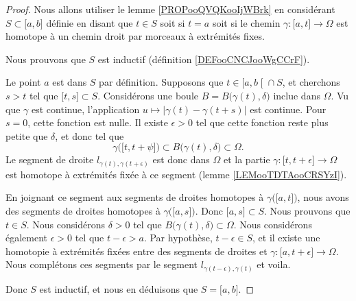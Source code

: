 \begin{proof}
	Nous allons utiliser le lemme \ref{PROPooQVQKooIjWBrk} en considérant \( S\subset \mathopen[ a , b \mathclose]\) définie en disant que \( t\in S\) soit si \( t=a\) soit si le chemin \( \gamma\colon \mathopen[ a , t \mathclose]\to \Omega \) est homotope à un chemin droit par morceaux à extrémités fixes.

	Nous prouvons que \( S\) est inductif (définition \ref{DEFooCNCJooWgCCrF}).
	\begin{subproof}
		\spitem[\( a\in S\)]
		Le point \( a\) est dans \( S\) par définition.
		\spitem[Si \( t\in S\)]
		Supposons que \( t\in \mathopen[ a , b \mathclose[\cap S\), et cherchons \( s>t\) tel que \( \mathopen[ t , s \mathclose]\subset S\). Considérons une boule \( B= B\big( \gamma(t),\delta \big)\) inclue dans \( \Omega\). Vu que \( \gamma\) est continue, l'application \( u\mapsto | \gamma(t)-\gamma(t+s) | \) est continue. Pour \( s=0\), cette fonction est nulle. Il existe \( \epsilon>0\) tel que cette fonction reste plus petite que \( \delta\), et donc tel que
		\begin{equation}
			\gamma\big( \mathopen[ t , t+\psi \mathclose] \big)\subset B\big( \gamma(t),\delta \big)\subset \Omega.
		\end{equation}
		Le segment de droite \( l_{\gamma(t),\gamma(t+\epsilon)} \) est donc dans \( \Omega\) et la partie \( \gamma\colon \mathopen[ t , t+\epsilon \mathclose]\to \Omega\) est homotope à extrémités fixée à ce segment (lemme \ref{LEMooTDTAooCRSYzI}).

		En joignant ce segment aux segments de droites homotopes à \(  \gamma\big( \mathopen[ a , t \mathclose] \big)  \), nous avons des segments de droites homotopes à \( \gamma\big( \mathopen[ a , s \mathclose] \big)\). Donc \( \mathopen[ a , s \mathclose]\subset S\).
		Nous prouvons que \( t\in S\). Nous considérons \( \delta>0\) tel que \( B\big( \gamma(t),\delta \big)\subset \Omega\). Nous considérons également \( \epsilon>0\) tel que \( t-\epsilon>a\). Par hypothèse, \( t-\epsilon\in S\), et il existe une homotopie à extrémités fixées entre des segments de droites et \( \gamma\colon \mathopen[ a , t+\epsilon \mathclose]\to \Omega\). Nous complétons ces segments par le segment \( l_{\gamma(t-\epsilon),\gamma(t)}\) et voila.
	\end{subproof}
	Donc \( S\) est inductif, et nous en déduisons que \( S=\mathopen[ a , b \mathclose]\).
\end{proof}

